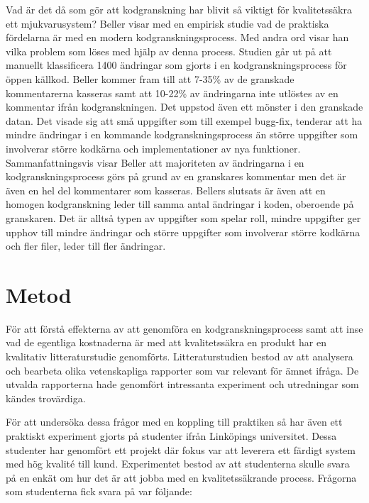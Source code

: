 Vad är det då som gör att kodgranskning har blivit så viktigt för kvalitetssäkra ett mjukvarusystem? Beller \cite{beller2014modern} visar med en empirisk studie vad de praktiska fördelarna är med en modern kodgranskningsprocess. Med andra ord visar han vilka problem som löses med hjälp av denna process. Studien går ut på att manuellt klassificera 1400 ändringar som gjorts i en kodgranskningsprocess för öppen källkod. Beller kommer fram till att 7-35\% av de granskade kommentarerna kasseras samt att 10-22\% av ändringarna inte utlöstes av en kommentar ifrån kodgranskningen. Det uppstod även ett mönster i den granskade datan. Det visade sig att små uppgifter som till exempel bugg-fix, tenderar att ha mindre ändringar i en kommande kodgranskningsprocess än större uppgifter som involverar större kodkärna och implementationer av nya funktioner. Sammanfattningsvis visar Beller att majoriteten av ändringarna i en kodgranskningsprocess görs på grund av en granskares kommentar men det är även en hel del kommentarer som kasseras. Bellers slutsats är även att en homogen kodgranskning leder till samma antal ändringar i koden, oberoende på granskaren. Det är alltså typen av uppgifter som spelar roll, mindre uppgifter ger upphov till mindre ändringar och större uppgifter som involverar större kodkärna och fler filer, leder till fler ändringar.

\section{Metod}
\label{sec:method-wallstrom}

För att förstå effekterna av att genomföra en kodgranskningsprocess samt att inse vad de egentliga kostnaderna är med att kvalitetssäkra en produkt har en kvalitativ litteraturstudie genomförts. Litteraturstudien bestod av att analysera och bearbeta olika vetenskapliga rapporter som var relevant för ämnet ifråga. De utvalda rapporterna hade genomfört intressanta experiment och utredningar som kändes trovärdiga.

För att undersöka dessa frågor med en koppling till praktiken så har även ett praktiskt experiment gjorts på studenter ifrån Linköpings universitet. Dessa studenter har genomfört ett projekt där fokus var att leverera ett färdigt system med hög kvalité till kund. Experimentet bestod av att studenterna skulle svara på en enkät om hur det är att jobba med en kvalitetssäkrande process. Frågorna som studenterna fick svara på var följande:

